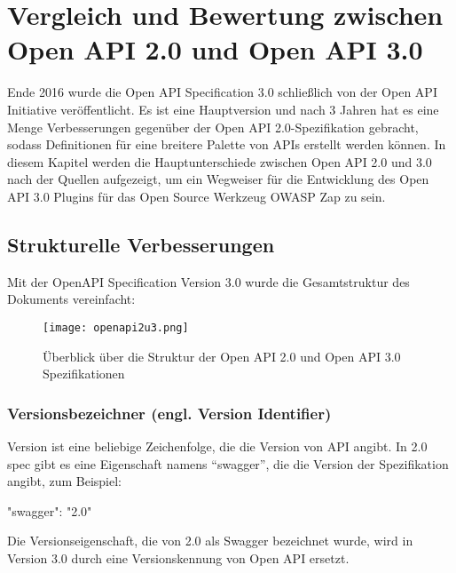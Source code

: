 \chapter{Vergleich und Bewertung zwischen Open API 2.0 und Open API 3.0}
\label{cha:k6}
Ende 2016 wurde die Open API Specification 3.0 schließlich von der Open API Initiative veröffentlicht. Es ist eine Hauptversion und nach 3 Jahren hat es eine Menge Verbesserungen gegenüber der Open API 2.0-Spezifikation gebracht, sodass Definitionen für eine breitere Palette von APIs erstellt werden können. In diesem Kapitel werden die Hauptunterschiede zwischen Open API 2.0 und 3.0 nach der Quellen\cite{swagger20Github, openapi20Github} aufgezeigt, um ein Wegweiser für die Entwicklung des Open API 3.0 Plugins für das Open Source Werkzeug OWASP Zap zu sein.

\section{Strukturelle Verbesserungen}

Mit der OpenAPI Specification Version 3.0 wurde die Gesamtstruktur des Dokuments vereinfacht:

\newpage

\begin{figure}[h]
	\centering
	\texttt{[image: openapi2u3.png]}
	\caption{Überblick über die Struktur der Open API 2.0 und Open API 3.0 Spezifikationen\cite{openapi2u317}}
	\label{openapi2u317-1}
\end{figure}

\subsection{Versionsbezeichner (engl. Version Identifier)}

Version ist eine beliebige Zeichenfolge, die die Version von API angibt\cite{openapiversion17}. In 2.0 spec gibt es eine Eigenschaft namens "`swagger"', die die Version der Spezifikation angibt, zum Beispiel:\\

\begin{LaTeXCode}[caption={Version von Swagger},captionpos=b, label=LaTeXCode:swagger2.0-1][numbers=none]
"swagger": "2.0"\\
\end{LaTeXCode}

Die Versionseigenschaft, die von 2.0 als Swagger bezeichnet wurde, wird in Version 3.0 durch eine Versionskennung von Open API ersetzt.\\


